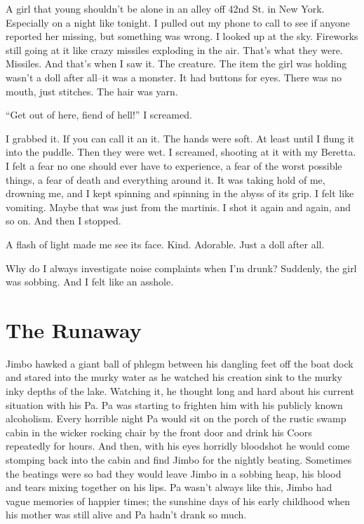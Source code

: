 A girl that young shouldn't be alone in an alley off 42nd St. in
New York. Especially on a night like tonight. I pulled out my phone
to call to see if anyone reported her missing, but something was
wrong. I looked up at the sky. Fireworks still going at it like
crazy missiles exploding in the air. That's what they were.
Missiles. And that's when I saw it. The creature. The item the girl
was holding wasn't a doll after all--it was a monster. It had
buttons for eyes. There was no mouth, just stitches. The hair was
yarn.



``Get out of here, fiend of hell!'' I screamed.



I grabbed it. If you can call it an it. The hands were soft. At
least until I flung it into the puddle. Then they were wet. I
screamed, shooting at it with my Beretta. I felt a fear no one
should ever have to experience, a fear of the worst possible
things, a fear of death and everything around it. It was taking
hold of me, drowning me, and I kept spinning and spinning in the
abyss of its grip. I felt like vomiting. Maybe that was just from
the martinis. I shot it again and again, and so on. And then I
stopped.



A flash of light made me see its face. Kind. Adorable. Just a doll
after all.



Why do I always investigate noise complaints when I'm drunk?
Suddenly, the girl was sobbing. And I felt like an asshole. 

 



\chapter{The Runaway}






Jimbo hawked a giant ball of phlegm between his dangling feet off
the boat dock and stared into the murky water as he watched his
creation sink to the murky inky depths of the lake. Watching it, he
thought long and hard about his current situation with his Pa. Pa
was starting to frighten him with his publicly known alcoholism.
Every horrible night Pa would sit on the porch of the rustic swamp
cabin in the wicker rocking chair by the front door and drink his
Coors repeatedly for hours. And then, with his eyes horridly
bloodshot he would come stomping back into the cabin and find Jimbo
for the nightly beating. Sometimes the beatings were so bad they
would leave Jimbo in a sobbing heap, his blood and tears mixing
together on his lips. Pa wasn't always like this, Jimbo had
vague memories of happier times; the sunshine days of his early
childhood when his mother was still alive and Pa hadn't drank
so much.

